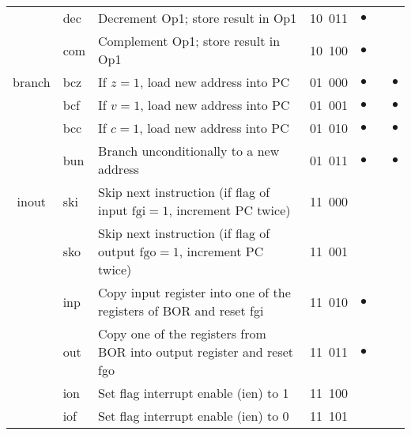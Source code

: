 \begin{table*}
\begin{center}
\begin{tabular}{cllcccc}
 & dec & Decrement Op1; store result in Op1 & 10\ 011 & $\bullet$ &&\\
 & com & Complement Op1; store result in Op1 & 10\ 100 & $\bullet$ &&\\
\hline
branch & bcz & If $z = 1$, load new address into PC & 01\ 000 & $\bullet$ & & $\bullet$\\
& bcf & If $v = 1$, load new address into PC & 01\ 001 & $\bullet$ & & $\bullet$\\
& bcc & If $c = 1$, load new address into PC & 01\ 010 & $\bullet$ & & $\bullet$\\
& bun & Branch unconditionally to a new address & 01\ 011 &$\bullet$ & & $\bullet$\\
\hline
inout &ski & Skip next instruction (if flag of input $\mathrm{fgi} = 1$,   increment PC  twice) & 11\ 000 &&&\\
& sko &Skip next instruction (if flag of output $\mathrm{fgo} = 1$, increment PC twice) & 11\ 001 &&&\\
&inp & Copy input register into one of the registers of  BOR and reset fgi & 11\ 010 & $\bullet$ &&\\
&out &Copy one of the registers from BOR into output  register and  reset fgo & 11\ 011 & $\bullet$ &&\\
& ion &Set flag interrupt enable (ien) to 1 & 11\ 100 &&&\\
& iof &Set flag interrupt enable (ien)  to 0     &11\ 101 & &&\\
\hline
\end{tabular}
\end{center}
\vspace*{15pt}
\end{table*}

